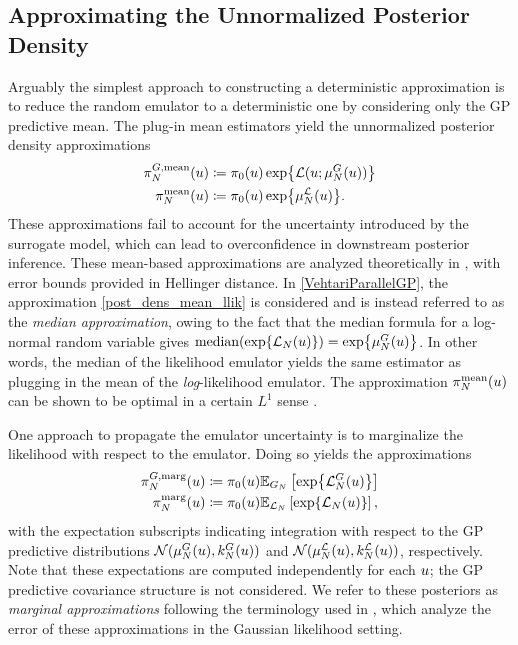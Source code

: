 \documentclass[12pt]{article}
\begin{document}
\subsection{Approximating the Unnormalized Posterior Density}
Arguably the simplest approach to constructing a deterministic approximation is to reduce the random emulator 
to a deterministic one by considering only the GP predictive mean. 
The plug-in mean estimators yield the unnormalized posterior density approximations 
\begin{align}
\fwdEmMeanDens[\Ndesign](\Par) &\Def \priorDens(\Par) \Exp{\llik(\Par; \emMean[\Ndesign]{\fwd}(\Par))}
 \label{post_dens_mean_fwd} \\
\llikEmMeanDens[\Ndesign](\Par) &\Def \priorDens(\Par) \Exp{\emMean[\Ndesign]{\llik}(\Par)} 
\label{post_dens_mean_llik}.
\end{align}
These approximations fail to account for the uncertainty introduced by the surrogate model, which can lead 
to overconfidence in downstream posterior inference. These mean-based approximations are analyzed 
theoretically in \cite{StuartTeck1}, with error bounds provided in Hellinger distance. In \ref{VehtariParallelGP}, 
the approximation \ref{post_dens_mean_llik} is considered and is instead referred to as the 
\textit{median approximation}, owing to the fact that the median formula for a log-normal random variable 
gives $\text{median}(\Exp{\llikEm[\Ndesign](\Par)}) = \Exp{\emMean[\Ndesign]{\fwd}(\Par)}$. In other words, 
the median of the likelihood emulator yields the same estimator as plugging in the mean of the 
\textit{log}-likelihood emulator.
The approximation $\llikEmMeanDens[\Ndesign](\Par)$ can be shown to be optimal in a certain  
$L^1$ sense \cite{VehtariParallelGP, StuartTeck2}. 

One approach to propagate the 
emulator uncertainty is to marginalize the likelihood with respect to the emulator. Doing so yields the approximations 
\begin{align}
\fwdEmMargDens[\Ndesign](\Par) &\Def \priorDens(\Par) \E_{\fwdEm}\left[\Exp{\llikEmFwd[\Ndesign](\Par)} \right] \label{post_dens_marg_fwd} \\
\llikEmMargDens[\Ndesign](\Par) &\Def \priorDens(\Par) \E_{\llikEm}\left[\Exp{\llikEm[\Ndesign](\Par)} \right], \label{post_dens_marg_llik}
\end{align}
with the expectation subscripts indicating integration with respect to the GP predictive distributions 
$\Gaussian(\emMean[\Ndesign]{\fwd}(\Par), \emKer[\Ndesign]{\fwd}(\Par))$ and
$\Gaussian(\emMean[\Ndesign]{\llik}(\Par), \emKer[\Ndesign]{\llik}(\Par))$, respectively. Note that these expectations are 
computed independently for each $\Par$; the GP predictive covariance structure is not considered. 
We refer to these posteriors as \textit{marginal approximations} following the terminology used in
 \cite{StuartTeck1, StuartTeck2}, which analyze the error of these approximations in the Gaussian likelihood setting. 
\end{document}

